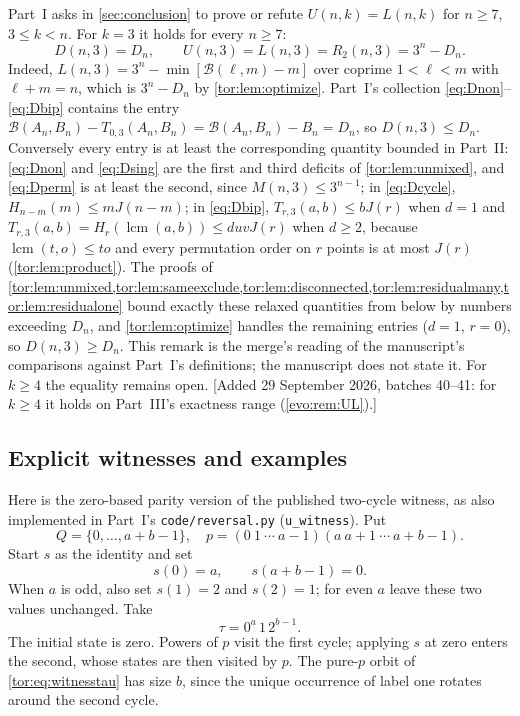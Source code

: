 \documentclass[11pt,a4paper]{article}
\numberwithin{equation}{section}
\theoremstyle{definition}
\theoremstyle{remark}
\newcommand{\lcm}{\operatorname{lcm}}
\newcommand{\Bip}{\mathcal B}
\begin{document}
\begin{remark}[The $k=3$ slice of Part~I's remaining extremal inequality;
added in the merge]\label{tor:rem:UL}
Part~I asks in \cref{sec:conclusion} to prove or refute
$U(n,k)=L(n,k)$ for $n\ge7$, $3\le k<n$. For $k=3$ it holds for every $n\ge7$:
\[
 D(n,3)=D_n,\qquad U(n,3)=L(n,3)=R_2(n,3)=3^n-D_n.
\]
Indeed, $L(n,3)=3^n-\min[\Bip(\ell,m)-m]$ over coprime $1<\ell<m$ with
$\ell+m=n$, which is $3^n-D_n$ by \cref{tor:lem:optimize}. Part~I's collection
\eqref{eq:Dnon}--\eqref{eq:Dbip} contains the entry
$\Bip(A_n,B_n)-T_{0,3}(A_n,B_n)=\Bip(A_n,B_n)-B_n=D_n$, so $D(n,3)\le D_n$.
Conversely every entry is at least the corresponding quantity bounded in
Part~II: \eqref{eq:Dnon} and \eqref{eq:Dsing} are the first and third
deficits of \cref{tor:lem:unmixed}, and \eqref{eq:Dperm} is at least the
second, since $M(n,3)\le3^{n-1}$; in \eqref{eq:Dcycle},
$H_{n-m}(m)\le mJ(n-m)$; in \eqref{eq:Dbip}, $T_{r,3}(a,b)\le bJ(r)$ when
$d=1$ and $T_{r,3}(a,b)=H_r(\lcm(a,b))\le duvJ(r)$ when $d\ge2$, because
$\lcm(t,o)\le to$ and every permutation order on $r$ points is at most $J(r)$
(\cref{tor:lem:product}). The proofs of
\cref{tor:lem:unmixed,tor:lem:sameexclude,tor:lem:disconnected,tor:lem:residualmany,tor:lem:residualone}
bound exactly these relaxed quantities from below by numbers exceeding $D_n$,
and \cref{tor:lem:optimize} handles the remaining entries ($d=1$, $r=0$), so
$D(n,3)\ge D_n$. This remark is the merge's reading of the manuscript's
comparisons against Part~I's definitions; the manuscript does not state it.
For $k\ge4$ the equality remains open. [Added 29 September 2026, batches 40--41: for $k\ge4$ it
holds on Part~III's exactness range (\cref{evo:rem:UL}).]
\end{remark}

\subsection{Explicit witnesses and examples}\label{tor:sec:witnesses}

Here is the zero-based parity version of the published two-cycle witness, as
also implemented in Part~I's \texttt{code/reversal.py} (\texttt{u\_witness}).
Put
\[
 Q=\{0,\ldots,a+b-1\},\quad
 p=(0\ 1\ \cdots\ a-1)(a\ a+1\ \cdots\ a+b-1).
\]
Start $s$ as the identity and set
\[
 s(0)=a,\qquad s(a+b-1)=0.
\]
When $a$ is odd, also set $s(1)=2$ and $s(2)=1$; for even $a$ leave these two
values unchanged. Take
\begin{equation}\label{tor:eq:witnesstau}
 \tau=0^a\,1\,2^{b-1}.
\end{equation}
The initial state is zero. Powers of $p$ visit the first cycle; applying $s$
at zero enters the second, whose states are then visited by $p$. The pure-$p$
orbit of \eqref{tor:eq:witnesstau} has size $b$, since the unique occurrence
of label one rotates around the second cycle.
\end{document}
